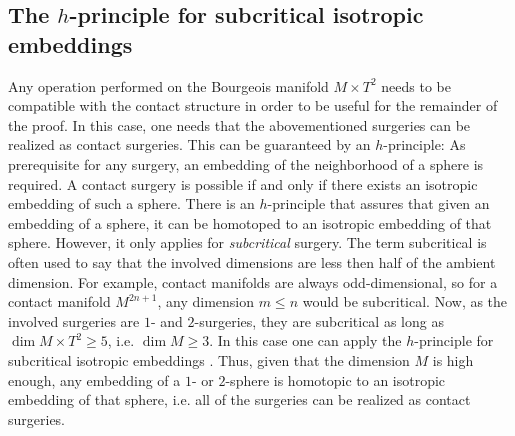 \subsection{The $h$-principle for subcritical isotropic embeddings}
Any operation performed on the Bourgeois manifold $M\times T^2$ needs to be compatible with the contact structure
in order to be useful for the remainder of the proof.
In this case, one needs that the abovementioned surgeries can be realized as contact surgeries.
This can be guaranteed by an $h$-principle:
As prerequisite for any surgery, an embedding of the neighborhood of a sphere is required. 
A contact surgery is possible if and only if there exists an isotropic embedding of such a sphere.
There is an $h$-principle that assures that given an embedding of a sphere, it can be homotoped to an isotropic embedding of that sphere.
However, it only applies for \textit{subcritical} surgery.
The term subcritical is often used to say that the involved dimensions are less then half of the ambient dimension.
For example, contact manifolds are always odd-dimensional, so for a contact manifold $M^{2n+1}$, any dimension $m \leq n$ would be subcritical.
Now, as the involved surgeries are $1$- and $2$-surgeries, they are subcritical as long as $\dim M\times T^2 \geq 5$, i.e. $\dim M \geq 3$.
In this case one can apply the $h$-principle for subcritical isotropic embeddings \cite[12.4.1]{EM02}.
Thus, given that the dimension $M$ is high enough, any embedding of a $1$- or $2$-sphere is homotopic to an isotropic embedding of that sphere,
i.e. all of the surgeries can be realized as contact surgeries.
